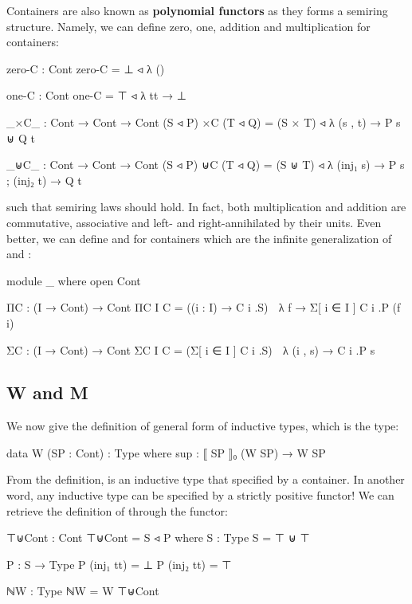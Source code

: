 Containers are also known as \textbf{polynomial functors} as they forms a semiring structure. Namely, we can define zero, one, addition and multiplication for containers:

\begin{code}
zero-C : Cont
zero-C = ⊥ ◃ λ ()

one-C : Cont
one-C = ⊤ ◃ λ{ tt → ⊥ }

_×C_ : Cont → Cont → Cont
(S ◃ P) ×C (T ◃ Q) = (S × T) ◃ λ (s , t) → P s ⊎ Q t

_⊎C_ : Cont → Cont → Cont
(S ◃ P) ⊎C (T ◃ Q) = (S ⊎ T) ◃ λ{ (inj₁ s) → P s ; (inj₂ t) → Q t }
\end{code}

such that semiring laws should hold. In fact, both multiplication and addition are commutative, associative and left- and right-annihilated by their units. Even better, we can define  and  for containers which are the infinite generalization of  and :

\begin{code}[hide]
module _ where
  open Cont
\end{code}

\begin{code}
  ΠC : (I → Cont) → Cont
  ΠC {I} C⃗ = ((i : I) → C⃗ i .S) ◃ λ f → Σ[ i ∈ I ] C⃗ i .P (f i)

  ΣC : (I → Cont) → Cont
  ΣC {I} C⃗ = (Σ[ i ∈ I ] C⃗ i .S) ◃ λ (i , s) → C⃗ i .P s
\end{code}

\subsection{W and M}

We now give the definition of general form of inductive types, which is the  type:

\begin{code}
data W (SP : Cont) : Type where
  sup : ⟦ SP ⟧₀ (W SP) → W SP
\end{code}

From the definition,  is an inductive type that specified by a container. In another word, any inductive type can be specified by a strictly positive functor! We can retrieve the definition of  through the  functor:

\begin{code}
⊤⊎Cont : Cont
⊤⊎Cont = S ◃ P
  where
  S : Type
  S = ⊤ ⊎ ⊤

  P : S → Type
  P (inj₁ tt) = ⊥
  P (inj₂ tt) = ⊤

ℕW : Type
ℕW = W ⊤⊎Cont
\end{code}

